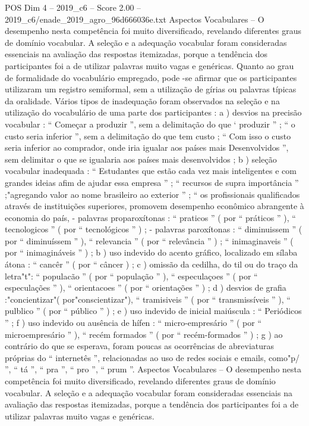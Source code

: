\begin{textsample}{POS Dim 4 – 2019\_c6 – Score 2.00 – 2019\_c6/enade\_2019\_agro\_96d666036e.txt}
Aspectos Vocabulares – O desempenho nesta competência foi muito diversificado, revelando diferentes graus de domínio vocabular.
A seleção e a adequação vocabular foram consideradas essenciais na avaliação das respostas itemizadas, porque a tendência dos participantes foi a de utilizar palavras muito vagas e genéricas.
Quanto ao grau de formalidade do vocabulário empregado, pode -se afirmar que os participantes utilizaram um registro semiformal, sem a utilização de gírias ou palavras típicas da oralidade.
Vários tipos de inadequação foram observados na seleção e na utilização do vocabulário de uma parte dos participantes : a ) desvios na precisão vocabular : “ Começar a produzir ”, sem a delimitação do que ‘ produzir ” ; “ o custo seria inferior ”, sem a delimitação do que tem custo ; “ Com isso o custo seria inferior ao comprador, onde iria igualar aos países mais Desenvolvidos ”, sem delimitar o que se igualaria aos países mais desenvolvidos ; b ) seleção vocabular inadequada : “ Estudantes que estão cada vez mais inteligentes e com grandes ideias afim de ajudar essa empresa ” ; “ recursos de supra importância ” ;"agregando valor ao nome brasileiro ao exterior ” ; “ os profissionais qualificados através de instituições superiores, promovem desempenho econômico abrangente à economia do país, - palavras proparoxítonas : “ praticos ” ( por “ práticos ” ), “ tecnologicos ” ( por “ tecnológicos ” ) ; - palavras paroxítonas : “ diminuissem ” ( por “ diminuíssem ” ), “ relevancia ” ( por “ relevância ” ) ; “ inimaginaveis ” ( por “ inimagináveis ” ) ; b ) uso indevido do acento gráfico, localizado em sílaba átona : “ cancêr ” ( por “ câncer ) ; c ) omissão da cedilha, do til ou do traço da letra"t": “ populacão ” ( por “ população ” ), “ especulaçoes ” ( por “ especulações ” ), “ orientacoes ” ( por “ orientações ” ) ; d ) desvios de grafia :"concientizar"( por"conscientizar"), “ tramisiveis ” ( por “ transmissíveis ” ), “ pulblico ” ( por “ público ” ) ; e ) uso indevido de inicial maiúscula : “ Periódicos ” ; f ) uso indevido ou ausência de hífen : “ micro-empresário ” ( por “ microempresário ” ), “ recém formados ” ( por “ recém-formados ” ) ; g ) ao contrário do que se esperava, foram poucas as ocorrências de abreviaturas próprias do “ internetês ”, relacionadas ao uso de redes sociais e emails, como"p/ ”, “ tá ”, “ pra ”, “ pro ”, “ prum ”.
Aspectos Vocabulares – O desempenho nesta competência foi muito diversificado, revelando diferentes graus de domínio vocabular.
A seleção e a adequação vocabular foram consideradas essenciais na avaliação das respostas itemizadas, porque a tendência dos participantes foi a de utilizar palavras muito vagas e genéricas.

\end{textsample}
